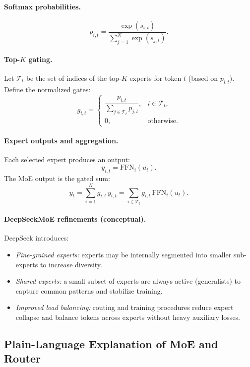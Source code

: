 \documentclass[11pt]{article}
\theoremstyle{remark}
\newcommand{\highlight}[1]{\colorbox{yellow!40}{#1}}
\begin{document}
\paragraph{Softmax probabilities.}
\[
p_{i,t} =
\frac{\exp(s_{i,t})}{\sum_{j=1}^N \exp(s_{j,t})}.
\]

\paragraph{Top-$K$ gating.}
Let $\mathcal{T}_t$ be the set of indices of the  \highlight{top-$K$ experts for token $t$ } (based on $p_{i,t}$). Define the \highlight{ normalized gates}:
\[
g_{i,t} =
\begin{cases}
\dfrac{p_{i,t}}{\sum_{j \in \mathcal{T}_t} p_{j,t}}, & i \in \mathcal{T}_t, \\[6pt]
0, & \text{otherwise}.
\end{cases}
\]

\paragraph{Expert outputs and aggregation.}
Each selected expert produces an output:
\[
y_{i,t} = \text{FFN}_i(u_t).
\]
The MoE output is the \highlight{gated sum}:
\[
y_t = \sum_{i=1}^N g_{i,t} \, y_{i,t}
    = \sum_{i \in \mathcal{T}_t} g_{i,t} \, \text{FFN}_i(u_t).
\]

\paragraph{DeepSeekMoE refinements (conceptual).}
DeepSeek introduces:
\begin{itemize}
  \item \emph{Fine-grained experts:} experts may be internally segmented into smaller sub-experts to increase diversity.
  \item  \highlight{ \emph{Shared experts:} } a small subset of experts are always active (generalists) to capture common patterns and stabilize training.
  \item \emph{Improved load balancing:} routing and training procedures reduce expert collapse and balance tokens across experts without heavy auxiliary losses.
\end{itemize}

\subsection{Plain-Language Explanation of MoE and Router}
\end{document}
